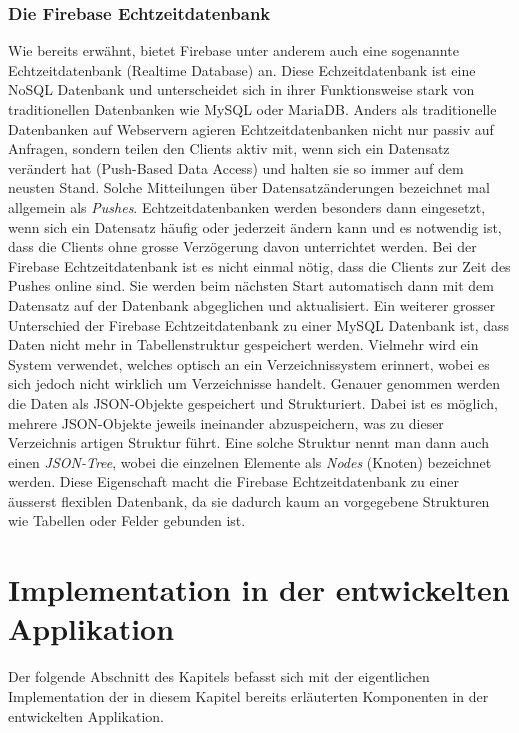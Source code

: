 \documentclass[../main.tex]{subfiles}
\begin{document}
	\subsubsection*{Die Firebase Echtzeitdatenbank} \label{firebaseRealtime}
	Wie bereits erwähnt, bietet Firebase unter anderem auch eine sogenannte Echtzeitdatenbank (Realtime Database) an. Diese Echzeitdatenbank ist eine NoSQL Datenbank und unterscheidet sich in ihrer Funktionsweise stark von traditionellen Datenbanken wie MySQL oder MariaDB. Anders als traditionelle Datenbanken auf Webservern agieren Echtzeitdatenbanken nicht nur passiv auf Anfragen, sondern teilen den Clients aktiv mit, wenn sich ein Datensatz verändert hat (Push-Based Data Access) und halten sie so immer auf dem neusten Stand. Solche Mitteilungen über Datensatzänderungen bezeichnet mal allgemein als \emph{Pushes}. Echtzeitdatenbanken werden besonders dann eingesetzt, wenn sich ein Datensatz häufig oder jederzeit ändern kann und es notwendig ist, dass die Clients ohne grosse Verzögerung davon unterrichtet werden.\cite{RealtimeDatabase} Bei der Firebase Echtzeitdatenbank ist es nicht einmal nötig, dass die Clients zur Zeit des Pushes online sind. Sie werden beim nächsten Start automatisch dann mit dem Datensatz auf der Datenbank abgeglichen und aktualisiert. Ein weiterer grosser Unterschied der Firebase Echtzeitdatenbank zu einer MySQL Datenbank ist, dass Daten nicht mehr in Tabellenstruktur gespeichert werden. Vielmehr wird ein System verwendet, welches optisch an ein Verzeichnissystem erinnert, wobei es sich jedoch nicht wirklich um Verzeichnisse handelt. Genauer genommen werden die Daten als JSON-Objekte gespeichert und Strukturiert. Dabei ist es möglich, mehrere JSON-Objekte jeweils ineinander abzuspeichern, was zu dieser Verzeichnis artigen Struktur führt. Eine solche Struktur nennt man dann auch einen \emph{JSON-Tree}, wobei die einzelnen Elemente als \emph{Nodes} (Knoten) bezeichnet werden. Diese Eigenschaft macht die Firebase Echtzeitdatenbank zu einer äusserst flexiblen Datenbank, da sie dadurch kaum an vorgegebene Strukturen wie Tabellen oder Felder gebunden ist. \cite{firebaseStructure}\cite{FirebaseRTDB}
	
	\section{Implementation in der entwickelten Applikation}\label{implementationServer}
	Der folgende Abschnitt des Kapitels befasst sich mit der eigentlichen Implementation der in diesem Kapitel bereits erläuterten Komponenten in der entwickelten Applikation.
	
\end{document}
